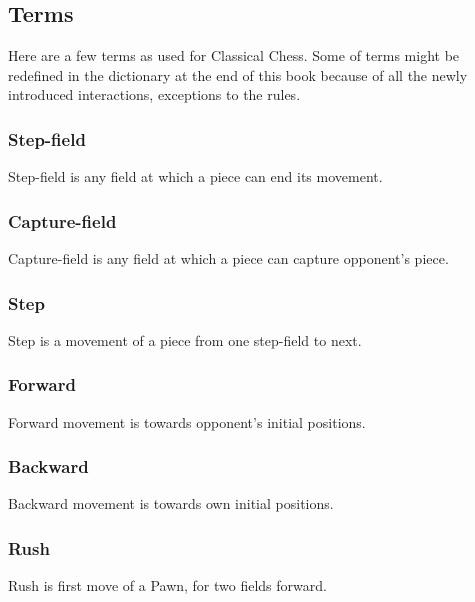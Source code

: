 \subsection*{Terms}
\label{sec:Classical Chess/Variants/Terms}

Here are a few terms as used for Classical Chess. Some of terms might be redefined
in the dictionary at the end of this book because of all the newly introduced
interactions, exceptions to the rules.

\subsubsection*{Step-field}
\label{sec:Classical Chess/Variants/Terms/Step-field}
Step-field is any field at which a piece can end its movement.

\subsubsection*{Capture-field}
\label{sec:Classical Chess/Variants/Terms/Capture-field}
Capture-field is any field at which a piece can capture opponent's piece.

\subsubsection*{Step}
\label{sec:Classical Chess/Variants/Terms/Step}
Step is a movement of a piece from one step-field to next.

\subsubsection*{Forward}
\label{sec:Classical Chess/Variants/Terms/Forward}
Forward movement is towards opponent's initial positions.

\subsubsection*{Backward}
\label{sec:Classical Chess/Variants/Terms/Backward}
Backward movement is towards own initial positions.

\subsubsection*{Rush}
\label{sec:Classical Chess/Variants/Terms/Rush}
Rush is first move of a Pawn, for two fields forward.

